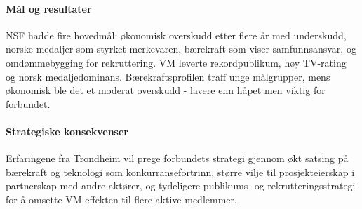 \paragraph{Mål og resultater}
NSF hadde fire hovedmål: økonomisk overskudd etter flere år med underskudd\parencite{Adresseavisen}, norske medaljer som styrket merkevaren, bærekraft som viser samfunnsansvar\parencite{TrondheimKommuneVM}, og omdømmebygging for rekruttering\parencite{OsloVM}. VM leverte rekordpublikum, høy TV-rating og norsk medaljedominans. Bærekraftsprofilen traff unge målgrupper, mens økonomisk ble det et moderat overskudd - lavere enn håpet men viktig for forbundet\parencite{Trondheim2025Portal,Adresseavisen}.

\paragraph{Strategiske konsekvenser}
Erfaringene fra Trondheim vil prege forbundets strategi gjennom økt satsing på bærekraft og teknologi som konkurransefortrinn, større vilje til prosjekteierskap i partnerskap med andre aktører, og tydeligere publikums- og rekrutteringsstrategi for å omsette VM-effekten til flere aktive medlemmer.
